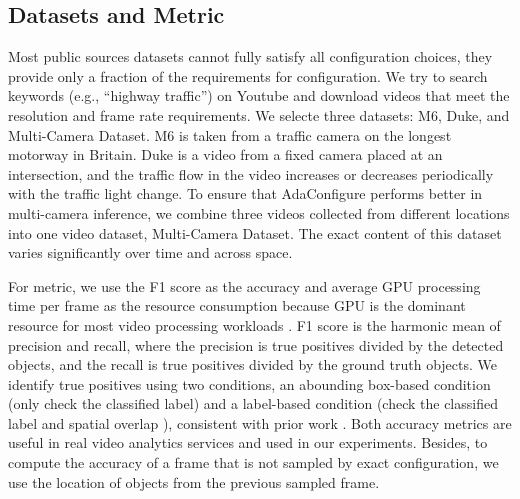 \subsection{Datasets and Metric}
\label{subsec: datasets}
Most public sources datasets cannot fully satisfy all configuration choices, they provide only a fraction of the requirements for configuration. %
We try to search keywords (e.g., ``highway traffic'') on Youtube and download videos that meet the resolution and frame rate requirements. We selecte three datasets: M6, Duke, and Multi-Camera Dataset. M6 is taken from a traffic camera on the longest motorway in Britain. Duke is a video from a fixed camera placed at an intersection, and the traffic flow in the video increases or decreases periodically with the traffic light change. 
To ensure that AdaConfigure performs better in multi-camera inference, we combine three videos collected from different locations into one video dataset, Multi-Camera Dataset. The exact content of this dataset varies significantly over time and across space.

For metric, we use the F1 score as the accuracy and average GPU processing time per frame as the resource consumption because GPU is the dominant resource for most video processing workloads \cite{jiang2018chameleon}. F1 score is the harmonic mean of precision and recall, where the precision is true positives divided by the detected objects, and the recall is true positives divided by the ground truth objects. We identify true positives using two conditions, an abounding box-based condition (only check the classified label) and a label-based condition (check the classified label and spatial overlap \cite{overlap}), consistent with prior work \cite{jiang2018chameleon,noscope}. Both accuracy metrics are useful in real video analytics services and used in our experiments. Besides, to compute the accuracy of a frame that is not sampled by exact configuration, we use the location of objects from the previous sampled frame. 

